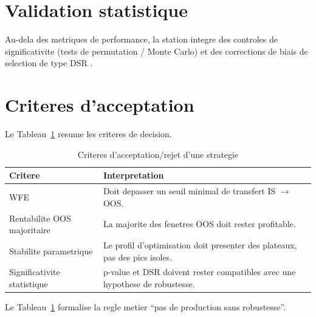 \section{Validation statistique}
Au-dela des metriques de performance, la station integre des controles de
significativite (tests de permutation / Monte Carlo) et des corrections de biais
de selection de type DSR \cite{bailey2014}.

\section{Criteres d'acceptation}
Le Tableau~\ref{tab:acceptance-backtest} resume les criteres de decision.

\begin{table}[H]
\centering
\caption{Criteres d'acceptation/rejet d'une strategie}
\label{tab:acceptance-backtest}
\begin{tabular}{p{4.5cm}p{8.8cm}}
\toprule
\textbf{Critere} & \textbf{Interpretation} \\
\midrule
WFE & Doit depasser un seuil minimal de transfert IS $\rightarrow$ OOS. \\
Rentabilite OOS majoritaire & La majorite des fenetres OOS doit rester profitable. \\
Stabilite parametrique & Le profil d'optimisation doit presenter des plateaux, pas des pics isoles. \\
Significativite statistique & p-value et DSR doivent rester compatibles avec une hypothese de robustesse. \\
\bottomrule
\end{tabular}
\end{table}

Le Tableau~\ref{tab:acceptance-backtest} formalise la regle metier ``pas de
production sans robustesse''.


